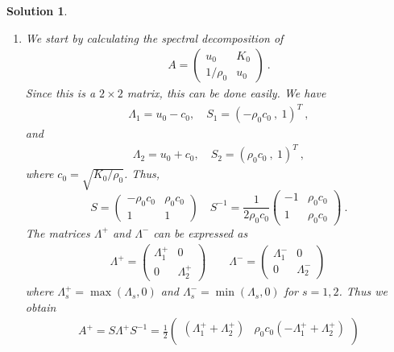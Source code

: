 \documentclass[10pt,letterpaper]{article}
\newcommand{\rb}[1]{ \left(  {#1} \right) }
\newcommand{\sqb}[1]{ \left(  {#1} \right) }
\theoremstyle{break}
\newtheorem{mysolution}{Solution}
\newenvironment{solution}{\begin{mysolution}}{\end{mysolution}}
\begin{document}
\begin{solution}
	\begin{enumerate}
		\item
		We start by calculating the spectral decomposition of
		\begin{gather}
			A=\sqb{
				\begin{array}{cc}
					u_{0} & K_{0}\\
					1/\rho_{0} & u_{0}
				\end{array}
			}\ .
		\end{gather}
		Since this is a $2\times2$ matrix, this can be done easily.
		We have
		\begin{gather}
			\Lambda_{1}=u_{0}-c_{0},
			\quad
			S_{1}=\rb{-\rho_{0}c_{0}\ ,\ 1}^T\ ,
		\end{gather}
		and
		\begin{gather}
			\Lambda_{2}=u_{0}+c_{0},
			\quad
			S_{2}=\rb{\rho_{0}c_{0}\ , \ 1}^T\ ,
		\end{gather}
		where $c_{0}=\sqrt{K_{0}/\rho_{0}}$.
		Thus,
		\begin{equation}
			S=\sqb{\begin{array}{cc}
				-\rho_{0}c_{0} & \rho_{0}c_{0}\\
				1 & 1
			\end{array}}
			\quad
			S^{-1}=\frac{1}{2\rho_{0}c_{0}}
				\sqb{\begin{array}{cc}
					-1 & \rho_{0}c_{0}\\
					1 & \rho_{0}c_{0}
				\end{array}}\ .
		\end{equation}
		The matrices $\Lambda^{+}$ and $\Lambda^{-}$ can be expressed as
		\begin{gather}
			\Lambda^{+}=\sqb{\begin{array}{cc}
				\Lambda_1^+ & 0\\
				0 & \Lambda_2^+
			\end{array}}
			\qquad
			\Lambda^{-}=\sqb{\begin{array}{cc}
				\Lambda_1^- & 0\\
				0 & \Lambda_2^-
			\end{array}}\ 
		\end{gather}
		where $\Lambda_s^+ = \max\left(\Lambda_s,0\right)$ and $\Lambda_s^- = \min\left(\Lambda_s,0\right)$ for $s=1,2$. Thus we obtain
		\begin{gather}
			A^{+}=S\Lambda^{+}S^{-1}
				=\frac{1}{2}\sqb{\begin{array}{cc}
					(\Lambda_1^+ + \Lambda_2^+) & \rho_{0}c_{0} (-\Lambda_1^+ + \Lambda_2^+)\\

\end{array}}
\end{gather}
\end{enumerate}
\end{solution}
\end{document}
